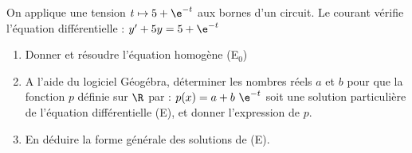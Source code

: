 \begin{exercice_cours}[\quad]{}

	On applique une tension $t\mapsto 5+\e^{-t}$ aux bornes d'un circuit. Le courant vérifie l'équation différentielle : $y'+5y=5+\e^{-t}$

\begin{enumerate}
	\item Donner et résoudre l'équation homogène (E$_0$)    \hfill\reponseLigne[7cm]{}
	\item A l’aide du logiciel Géogébra, déterminer les nombres réels $a$ et $b$ pour que la fonction $p$ définie sur $\R$ par : $p(x) = a + b~\e^{-t}$ soit une solution particulière de l'équation différentielle (E), et donner l’expression de $p$. \hfill\reponseLigne[7cm]{}
	\item En déduire la forme générale des solutions de (E).  \hfill\reponseLigne[7cm]{}  
\end{enumerate}
\end{exercice_cours}


